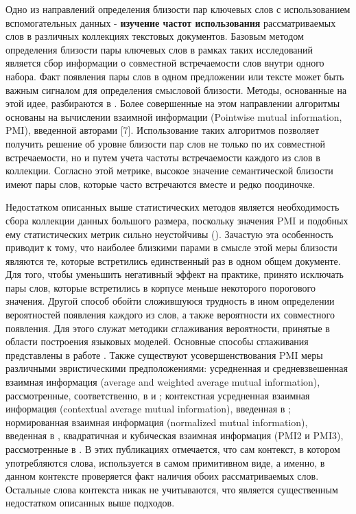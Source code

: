 Одно из направлений определения близости пар ключевых слов с использованием вспомогательных данных - \textbf{изучение частот использования} рассматриваемых слов в различных коллекциях текстовых документов. Базовым методом определения близости пары ключевых слов в рамках таких исследований является сбор информации о совместной встречаемости слов внутри одного набора. Факт появления пары слов в одном предложении или тексте может быть важным сигналом для определения смысловой близости. Методы, основанные на этой идее, разбираются в \cite{freq_1,freq_2,pmi}. Более совершенные на этом направлении алгоритмы основаны на вычислении взаимной информации (Pointwise mutual information, PMI), введенной авторами [7]. Использование таких алгоритмов позволяет получить решение об уровне близости пар слов  не только по их совместной встречаемости, но и путем учета частоты встречаемости каждого из слов в коллекции. Согласно этой метрике, высокое значение семантической близости имеют пары слов, которые часто встречаются вместе и редко поодиночке. 

Недостатком описанных выше статистических методов является необходимость сбора коллекции данных большого размера, поскольку значения PMI и подобных ему статистических метрик сильно неустойчивы (\cite{lm}).  Зачастую эта особенность приводит к тому, что наиболее близкими парами в смысле этой меры близости являются те, которые встретились единственный раз в одном общем документе. Для того, чтобы уменьшить негативный эффект на практике, принято исключать пары слов, которые встретились в корпусе меньше некоторого порогового значения. Другой способ обойти сложившуюся трудность в ином определении вероятностей появления каждого из слов, а также вероятности их совместного появления. Для этого служат методики сглаживания вероятности, принятые в области построения языковых моделей. Основные способы сглаживания представлены в работе \cite{lm}. Также существуют усовершенствования PMI меры различными эвристическими предположениями: усредненная и средневзвешенная взаимная информация (average and weighted average mutual information), рассмотренные, соответственно, в \cite{avg_pmi} и \cite{w_avg_pmi}; контекстная усредненная взаимная информация (contextual average mutual information), введенная в \cite{context_pmi}; нормированная взаимная информация (normalized mutual information), введенная в \cite{npmi}, квадратичная и кубическая взаимная информация (PMI2 и PMI3), рассмотренные в \cite{pmi23}.  В этих публикациях отмечается, что сам контекст, в котором употребляются слова, используется в самом примитивном виде, а именно, в данном контексте проверяется факт наличия обоих рассматриваемых слов. Остальные слова контекста никак не учитываются, что является существенным недостатком описанных выше подходов.

